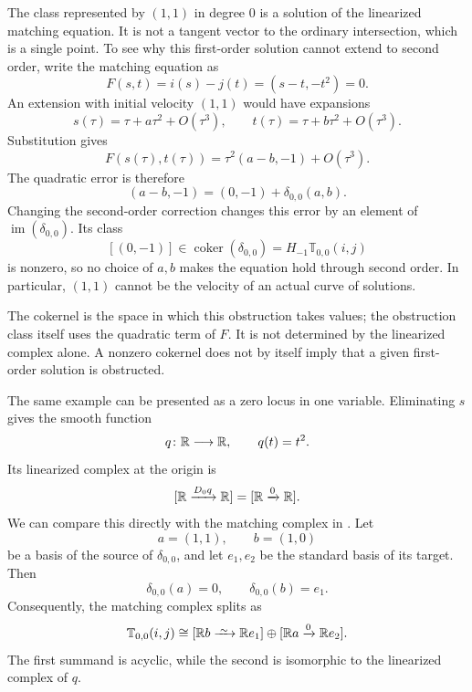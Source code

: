 
The class represented by $(1,1)$ in degree $0$ is a solution of the linearized
matching equation. It is not a tangent vector to the ordinary intersection,
which is a single point. To see why this first-order solution cannot extend
to second order, write the matching equation as
\[
  F(s,t)=i(s)-j(t)=(s-t,-t^2)=0.
\]
An extension with initial velocity $(1,1)$ would have expansions
\[
  s(\tau)=\tau+a\tau^2+O(\tau^3),
  \qquad
  t(\tau)=\tau+b\tau^2+O(\tau^3).
\]
Substitution gives
\[
  F(s(\tau),t(\tau))=\tau^2(a-b,-1)+O(\tau^3).
\]
The quadratic error is therefore
\[
  (a-b,-1)=(0,-1)+\delta_{0,0}(a,b).
\]
Changing the second-order correction changes this error by an element of
$\operatorname{im}(\delta_{0,0})$. Its class
\[
  [(0,-1)]\in\operatorname{coker}(\delta_{0,0})
  =H_{-1}\mathbb{T}_{0,0}(i,j)
\]
is nonzero, so no choice of $a,b$ makes the equation hold through second
order. In particular, $(1,1)$ cannot be the velocity of an actual curve of
solutions.

The cokernel is the space in which this obstruction takes values; the
obstruction class itself uses the quadratic term of $F$. It is not determined
by the linearized complex alone. A nonzero cokernel does not by itself imply
that a given first-order solution is obstructed.

The same example can be presented as a zero locus in one variable. Eliminating
$s$ gives the smooth function
\[
  q\colon\mathbb{R}\longrightarrow\mathbb{R},
  \qquad
  q(t)=t^2.
\]
Its linearized complex at the origin is
\[
  [\mathbb{R}\xrightarrow{D_0q}\mathbb{R}]
  =
  [\mathbb{R}\xrightarrow{0}\mathbb{R}].
\]
We can compare this directly with the matching complex in
. Let
\[
  a=(1,1),
  \qquad
  b=(1,0)
\]
be a basis of the source of $\delta_{0,0}$, and let $e_1,e_2$ be the standard
basis of its target. Then
\[
  \delta_{0,0}(a)=0,
  \qquad
  \delta_{0,0}(b)=e_1.
\]
Consequently, the matching complex splits as
\[
  \mathbb{T}_{0,0}(i,j)
  \cong
  [\R b\iso\R e_1]
  \oplus
  [\R a\xrightarrow{0}\R e_2].
\]
The first summand is acyclic, while the second is isomorphic to the linearized
complex of $q$.

